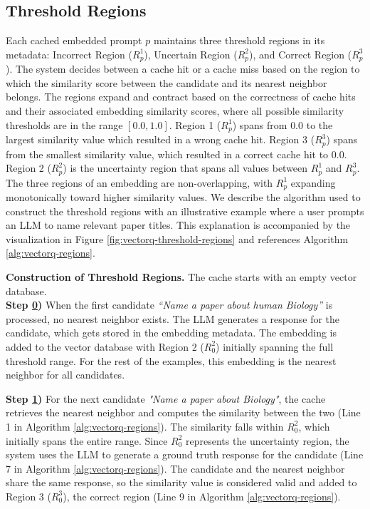 \subsection{Threshold Regions}
\label{threshold-regions}
Each cached embedded prompt $p$ maintains three threshold regions in its metadata: Incorrect Region ($R_p^1$), Uncertain Region ($R_p^2$), and Correct Region ($R_p^3$). The system decides between a cache hit or a cache miss based on the region to which the similarity score between the candidate and its nearest neighbor belongs. The regions expand and contract based on the correctness of cache hits and their associated embedding similarity scores, where all possible similarity thresholds are in the range $[0.0, 1.0]$. Region 1 ($R_p^1$) spans from $0.0$ to the largest similarity value which resulted in a wrong cache hit. Region 3 ($R_p^3$) spans from the smallest similarity value, which resulted in a correct cache hit to $0.0$. Region 2 ($R_p^2$) is the uncertainty region that spans all values between $R_p^1$ and $R_p^3$. The three regions of an embedding are non-overlapping, with $R_p^1$ expanding monotonically toward higher similarity values. We describe the algorithm used to construct the threshold regions with an illustrative example where a user prompts an LLM to name relevant paper titles. This explanation is accompanied by the visualization in Figure \ref{fig:vectorq-threshold-regions} and references Algorithm \ref{alg:vectorq-regions}.

\textbf{Construction of Threshold Regions.} The cache starts with an empty vector database.\\
\textbf{Step \hyperref[fig:vectorq-threshold-regions]{0})} When the first candidate \textit{``Name a paper about human Biology''} is processed, no nearest neighbor exists. The LLM generates a response for the candidate, which gets stored in the embedding metadata. The embedding is added to the vector database with Region 2 ($R_0^2$) initially spanning the full threshold range. For the rest of the examples, this embedding is the nearest neighbor for all candidates.

\textbf{Step \hyperref[fig:vectorq-threshold-regions]{1})} For the next candidate \textit{"Name a paper about Biology"}, the cache retrieves the nearest neighbor and computes the similarity between the two (Line 1 in Algorithm \ref{alg:vectorq-regions}). The similarity falls within $R_0^2$, which initially spans the entire range. Since $R_0^2$ represents the uncertainty region, the system uses the LLM to generate a ground truth response for the candidate (Line 7 in Algorithm \ref{alg:vectorq-regions}). The candidate and the nearest neighbor share the same response, so the similarity value is considered valid and added to Region 3 ($R_0^3$), the correct region (Line 9 in Algorithm  \ref{alg:vectorq-regions}).

